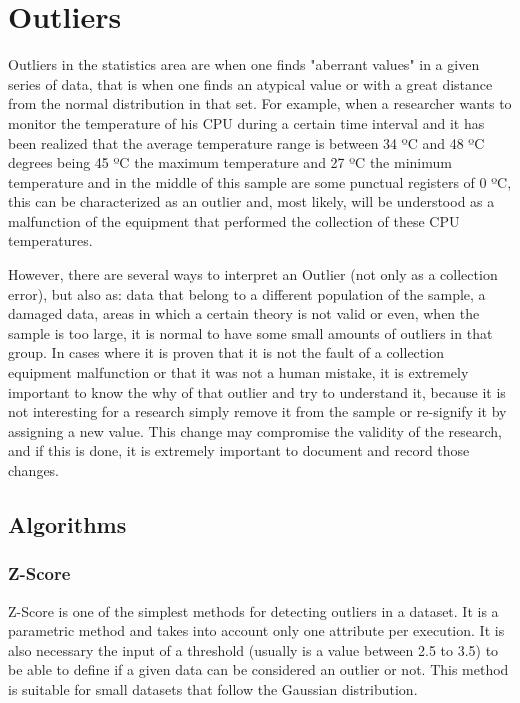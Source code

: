\chapter{Outliers}


Outliers in the statistics area are when one finds "aberrant values" in a given 
series of data, that is when one finds an atypical value or with a great distance 
from the normal distribution in that set. For example, when a researcher wants to 
monitor the temperature of his CPU during a certain time interval and it has been 
realized that the average temperature range is between 34 ºC and 48 ºC degrees
being 45 ºC the maximum temperature and 27 ºC the minimum temperature and in the 
middle of this sample are some punctual registers of 0 ºC, this can be characterized
as an outlier and, most likely, will be understood as a malfunction of the equipment
that performed the collection of these CPU temperatures.

However, there are several ways to interpret an Outlier (not only as a collection 
error), but also as: data that belong to a different population of the sample, a 
damaged data, areas in which a certain theory is not valid or even, when the sample 
is too large, it is normal to have some small amounts of outliers in that group.
In cases where it is proven that it is not the fault of a collection equipment 
malfunction or that it was not a human mistake, it is extremely important to know 
the why of that outlier and try to understand it, because it is not interesting for 
a research simply remove it from the sample or re-signify it by assigning a new 
value. This change may compromise the validity of the research, and if this is 
done, it is extremely important to document and record those changes.


\section{Algorithms}

\subsection{Z-Score}

Z-Score is one of the simplest methods for detecting outliers in a dataset. It is a 
parametric method and takes into account only one attribute per execution. It is also
necessary the input of a threshold (usually is a value between 2.5 to 3.5) to be able
to define if a given data can be considered an outlier or not. This method is suitable
for small datasets that follow the Gaussian distribution.


